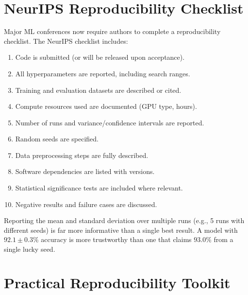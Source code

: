 \section{NeurIPS Reproducibility Checklist}
\label{sec:neurips-checklist}

Major ML conferences now require authors to complete a reproducibility
checklist. The NeurIPS checklist includes:

\begin{bestpractice}[title=\textbf{NeurIPS-style reproducibility checklist}]
\begin{enumerate}
  \item Code is submitted (or will be released upon acceptance).
  \item All hyperparameters are reported, including search ranges.
  \item Training and evaluation datasets are described or cited.
  \item Compute resources used are documented (GPU type, hours).
  \item Number of runs and variance/confidence intervals are reported.
  \item Random seeds are specified.
  \item Data preprocessing steps are fully described.
  \item Software dependencies are listed with versions.
  \item Statistical significance tests are included where relevant.
  \item Negative results and failure cases are discussed.
\end{enumerate}
\end{bestpractice}

\begin{remark}
Reporting the mean and standard deviation over multiple runs (e.g., 5
runs with different seeds) is far more informative than a single best
result. A model with $92.1 \pm 0.3\%$ accuracy is more trustworthy
than one that claims $93.0\%$ from a single lucky seed.
\end{remark}

\section{Practical Reproducibility Toolkit}
\label{sec:repro-toolkit}


